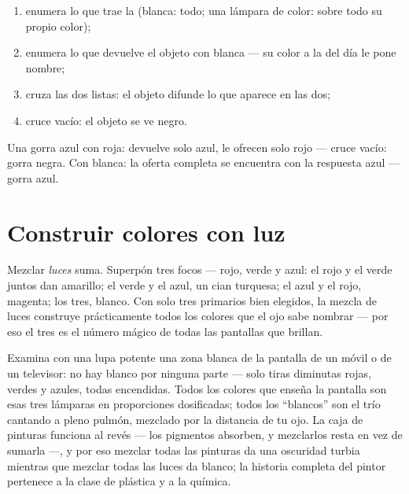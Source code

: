 \begin{method}\label{met:g8:colors-spectra:predict}
\begin{enumerate}
  \item enumera lo que trae la  (blanca: todo; una lámpara de
        color: sobre todo su propio color);
  \item enumera lo que devuelve el objeto con  blanca --- su
        color a la  del día le pone nombre;
  \item cruza las dos listas: el objeto difunde lo que aparece en
        las dos;
  \item cruce vacío: el objeto se ve negro.
\end{enumerate}
Una gorra azul con  roja: devuelve solo azul, le ofrecen solo
rojo --- cruce vacío: gorra negra. Con  blanca: la oferta
completa se encuentra con la respuesta azul --- gorra azul.
\end{method}

\section{Construir colores con luz}

\begin{example}\label{ex:g8:colors-spectra:additive}
Mezclar \emph{luces} suma. Superpón tres focos --- rojo, verde y
azul: el rojo y el verde juntos dan amarillo; el verde y el azul, un
cian turquesa; el azul y el rojo, magenta; los tres, blanco. Con solo
tres primarios bien elegidos, la mezcla de luces construye
prácticamente todos los colores que el ojo sabe nombrar --- por eso el
tres es el número mágico de todas las pantallas que brillan.
\end{example}

\begin{example}\label{ex:g8:colors-spectra:screen}
Examina con una lupa potente una zona blanca de la pantalla de un móvil
o de un televisor: no hay blanco por ninguna parte --- solo tiras
diminutas rojas, verdes y azules, todas encendidas. Todos los colores
que enseña la pantalla son esas tres lámparas en proporciones
dosificadas; todos los ``blancos'' son el trío cantando a pleno pulmón,
mezclado por la distancia de tu ojo. La caja de pinturas funciona al
revés --- los pigmentos absorben, y mezclarlos resta  en vez
de sumarla ---, y por eso mezclar todas las pinturas da una oscuridad
turbia mientras que mezclar todas las luces da blanco; la
historia completa del pintor pertenece a la clase de plástica y a la
química.
\end{example}

